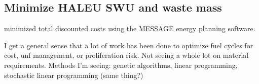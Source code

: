\subsection{Minimize HALEU SWU and waste mass}



\cite{andrianov_optimization_2019} minimized total discounted costs using 
the MESSAGE energy planning software. 

I get a general sense that a lot of work has been done to optimize fuel cycles 
for cost, unf management, or proliferation risk. Not seeing a whole lot on 
material requirements. 
Methods I'm seeing: genetic algorithms, linear programming, stochastic linear 
programming (same thing?)
